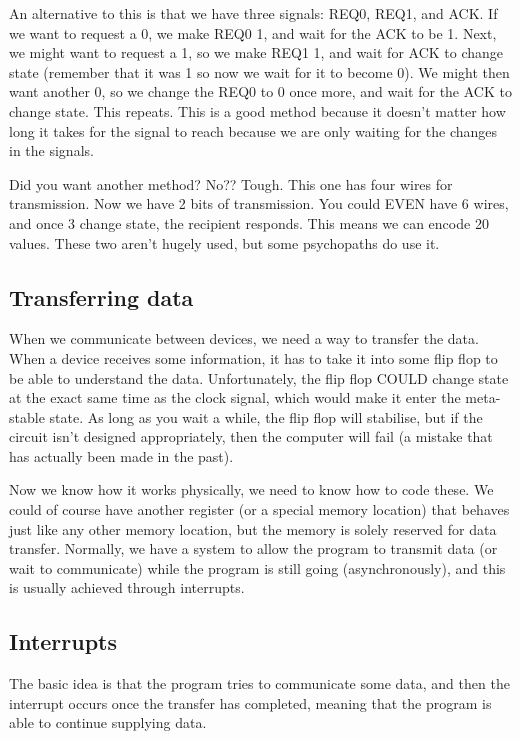 \documentclass[11pt,a4paper,titlepage,dvipsnames,cmyk]{scrartcl}
\begin{document}
An alternative to this is that we have three signals: REQ0, REQ1, and ACK.
If we want to request a 0, we make REQ0 1, and wait for the ACK to be 1.
Next, we might want to request a 1, so we make REQ1 1, and wait for ACK to
change state (remember that it was 1 so now we wait for it to become 0).
We might then want another 0, so we change the REQ0 to 0 once more, and
wait for the ACK to change state. This repeats. This is a good method
because it doesn't matter how long it takes for the signal to reach
because we are only waiting for the changes in the signals.

Did you want another method? No?? Tough. This one has four wires for
transmission. Now we have 2 bits of transmission. You could EVEN have 6
wires, and once 3 change state, the recipient responds. This means we can
encode 20 values. These two aren't hugely used, but some psychopaths do
use it.

\subsection{Transferring data}%
\label{sub:Transferring data}
When we communicate between devices, we need a way to transfer the data.
When a device receives some information, it has to take it into some flip
flop to be able to understand the data. Unfortunately, the flip flop COULD
change state at the exact same time as the clock signal, which would make
it enter the meta-stable state. As long as you wait a while, the flip flop
will stabilise, but if the circuit isn't designed appropriately, then the
computer will fail (a mistake that has actually been made in the past).

Now we know how it works physically, we need to know how to code these. We
could of course have another register (or a special memory location) that
behaves just like any other memory location, but the memory is solely
reserved for data transfer. Normally, we have a system to allow the
program to transmit data (or wait to communicate) while the program is
still going (asynchronously), and this is usually achieved through
interrupts.

\subsection{Interrupts}%
\label{sub:Interrupts}
The basic idea is that the program tries to communicate some data, and
then the interrupt occurs once the transfer has completed, meaning that
the program is able to continue supplying data.
\end{document}
